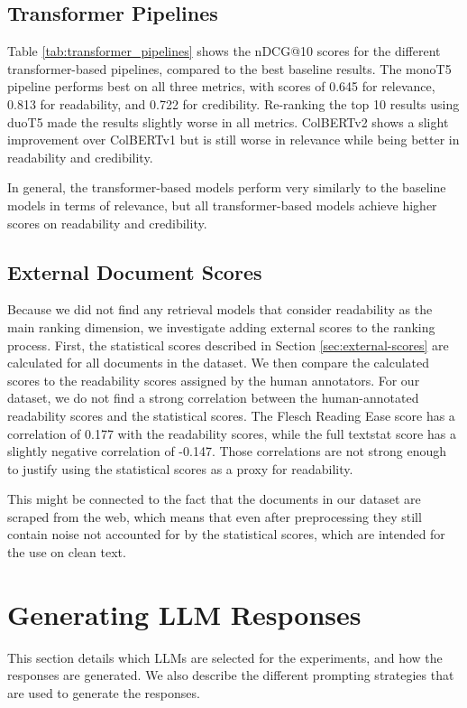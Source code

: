 \subsection{Transformer Pipelines}
Table \ref{tab:transformer_pipelines} shows the nDCG@10 scores for the different transformer-based pipelines, compared to the best baseline results.
The monoT5 pipeline performs best on all three metrics, with scores of 0.645 for relevance, 0.813 for readability, and 0.722 for credibility.
Re-ranking the top 10 results using duoT5 made the results slightly worse in all metrics.
ColBERTv2 shows a slight improvement over ColBERTv1 but is still worse in relevance while being better in readability and credibility.

In general, the transformer-based models perform very similarly to the baseline models in terms of relevance, but all transformer-based models achieve higher scores on readability and credibility.

\subsection{External Document Scores}
Because we did not find any retrieval models that consider readability as the main ranking dimension, we investigate adding external scores to the ranking process.
First, the statistical scores described in Section \ref{sec:external-scores} are calculated for all documents in the dataset.
We then compare the calculated scores to the readability scores assigned by the human annotators.
For our dataset, we do not find a strong correlation between the human-annotated readability scores and the statistical scores.
The Flesch Reading Ease score has a correlation of 0.177 with the readability scores, while the full textstat score has a slightly negative correlation of -0.147.
Those correlations are not strong enough to justify using the statistical scores as a proxy for readability.

This might be connected to the fact that the documents in our dataset are scraped from the web, which means that even after preprocessing they still contain noise not accounted for by the statistical scores, which are intended for the use on clean text.

\section{Generating LLM Responses}
This section details which LLMs are selected for the experiments, and how the responses are generated.
We also describe the different prompting strategies that are used to generate the responses.

